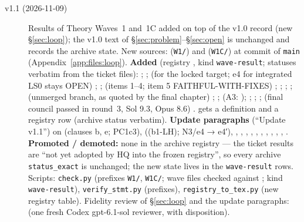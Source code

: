 \begin{description}
\item[v1.1 (2026-11-09)] Results of Theory Waves~1 and~1C added on top of the v1.0 record (new \S\ref{sec:loop}); the v1.0 text of \S\ref{sec:problem}--\S\ref{sec:open} is unchanged and records the archive state. New sources:  (\texttt{W1/}) and  (\texttt{W1C/}) at commit \texttt{\wavecommit} of \texttt{main} (Appendix~\ref{app:files:loop}). \textbf{Added} (registry , kind \texttt{wave-result}; statuses verbatim from the ticket files):   ;   ;   (for the locked target; e4 for integrated LS0 stays OPEN) ;   ;   (items 1--4; item 5 FAITHFUL-WITH-FIXES) ;   ;   ;   ;   (unmerged branch, as quoted by the final chapter) ;   ;    (A3:  ); ;   ;   ;  (final council passed in round~3, Sol 9.3, Opus 8.6) .  gets a definition and a registry row (archive status verbatim). \textbf{Update paragraphs} (``Update v1.1'') on  (clauses b, e; PC1c3),  ((b1-LH); N3/e4 → e4′), , , , , , , , , , , . \textbf{Promoted / demoted:} none in the archive registry — the ticket results are ``not yet adopted by HQ into the frozen registry'', so every archive \texttt{status\_exact} is unchanged; the new state lives in the \texttt{wave-result} rows. Scripts: \texttt{check.py} (prefixes \texttt{W1/}, \texttt{W1C/}; wave files checked against \texttt{\wavecommit}; kind \texttt{wave-result}), \texttt{verify\_stmt.py} (prefixes), \texttt{registry\_to\_tex.py} (new registry table). Fidelity review of \S\ref{sec:loop} and the update paragraphs:  (one fresh Codex gpt-6.1-sol reviewer, with disposition).
\end{description}
